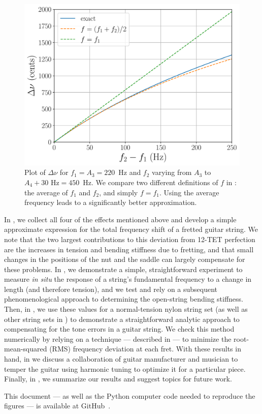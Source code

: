 \begin{figure}
    \centering
    \includegraphics[width=6.5in]{figures/diff_pitch}
    \caption{\label{fig:diff_pitch} Plot of $\Delta \nu$ for $f_1 = A_3 = 220$~Hz and $f_2$ varying from $A_3$ to $A_4 + 30 \textrm{ Hz} = 450$~Hz. We compare two different definitions of $f$ in : the average of $f_1$ and $f_2$, and simply $f = f_1$. Using the average frequency leads to a significantly better approximation.}
\end{figure}

In , we collect all four of the effects mentioned above and develop a simple approximate expression for the total frequency shift of a fretted guitar string. We note that the two largest contributions to this deviation from 12-TET perfection are the increases in tension and bending stiffness due to fretting, and that small changes in the positions of the nut and the saddle can largely compensate for these problems. In , we demonstrate a simple, straightforward experiment to measure \emph{in situ} the response of a string's fundamental frequency to a change in length (and therefore tension), and we test and rely on a subsequent phenomenological approach to determining the open-string bending stiffness. Then, in , we use these values for a normal-tension nylon string set (as well as other string sets in ) to demonstrate a straightforward analytic approach to compensating for the tone errors in a guitar string. We check this method numerically by relying on a technique --- described in  --- to minimize the root-mean-squared (RMS) frequency deviation at each fret. With these results in hand, in  we discuss a collaboration of guitar manufacturer and musician to temper the guitar using harmonic tuning to optimize it for a particular piece. Finally, in , we summarize our results and suggest topics for future work.

This document --- as well as the Python computer code needed to reproduce the figures --- is available at GitHub~\cite{ref:github2024rgb}. 